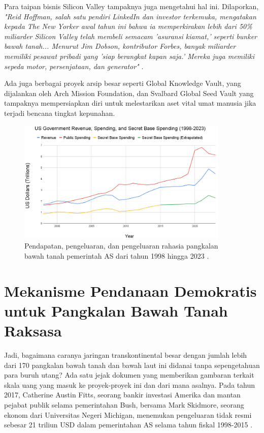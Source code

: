 \documentclass[10pt,twocolumn,letterpaper]{article}
\begin{document}
Para taipan bisnis Silicon Valley tampaknya juga mengetahui hal ini. Dilaporkan, \textit{"Reid Hoffman, salah satu pendiri LinkedIn dan investor terkemuka, mengatakan kepada The New Yorker awal tahun ini bahwa ia memperkirakan lebih dari 50\% miliarder Silicon Valley telah membeli semacam 'asuransi kiamat,' seperti bunker bawah tanah... Menurut Jim Dobson, kontributor Forbes, banyak miliarder memiliki pesawat pribadi yang 'siap berangkat kapan saja.' Mereka juga memiliki sepeda motor, persenjataan, dan generator"} \cite{28}.

Ada juga berbagai proyek arsip besar seperti Global Knowledge Vault, yang dijalankan oleh Arch Mission Foundation, \cite{29} dan Svalbard Global Seed Vault \cite{30} yang tampaknya mempersiapkan diri untuk melestarikan aset vital umat manusia jika terjadi bencana tingkat kepunahan.

\begin{figure}[t]
\begin{center}
\includegraphics[width=0.9\textwidth]{govcrop2.png}
\end{center}
   \caption{Pendapatan, pengeluaran, dan pengeluaran rahasia pangkalan bawah tanah pemerintah AS dari tahun 1998 hingga 2023 \cite{19}.}
   \label{fig:9}
\end{figure}
\section{Mekanisme Pendanaan Demokratis untuk Pangkalan Bawah Tanah Raksasa}

Jadi, bagaimana caranya jaringan transkontinental besar dengan jumlah lebih dari 170 pangkalan bawah tanah dan bawah laut ini didanai tanpa sepengetahuan para buruh utang? Ada satu jejak dokumen yang memberikan gambaran terkait skala uang yang masuk ke proyek-proyek ini dan dari mana asalnya. Pada tahun 2017, Catherine Austin Fitts, seorang bankir investasi Amerika dan mantan pejabat publik selama pemerintahan Bush, bersama Mark Skidmore, seorang ekonom dari Universitas Negeri Michigan, menemukan pengeluaran tidak resmi sebesar 21 triliun USD dalam pemerintahan AS selama tahun fiskal 1998-2015 \cite{11,12,13}.
\end{document}

